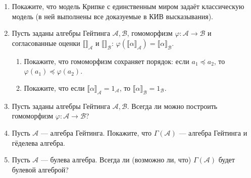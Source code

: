 \documentclass[10pt,a4paper,oneside]{article}
\begin{document}
\begin{enumerate}
\item Покажите, что модель Крипке с единственным миром задаёт классическую модель (в ней выполнены
все доказуемые в КИВ высказывания).

\item Пусть заданы алгебры Гейтинга $\mathcal{A},\mathcal{B}$, гомоморфизм $\varphi: \mathcal{A} \rightarrow \mathcal{B}$
и согласованные оценки $\llbracket\rrbracket_\mathcal{A}$ и $\llbracket\rrbracket_\mathcal{B}$: 
$\varphi(\llbracket\alpha\rrbracket_\mathcal{A}) = \llbracket\alpha\rrbracket_\mathcal{B}$.
\begin{enumerate}
\item Покажите, что гомоморфизм сохраняет порядок: если $a_1\preceq a_2$, то $\varphi(a_1) \preceq \varphi(a_2)$.
\item Покажите, что если $\llbracket \alpha \rrbracket_\mathcal{A} = 1_\mathcal{A}$, то $\llbracket\alpha\rrbracket_\mathcal{B} = 1_\mathcal{B}$.
\end{enumerate}

\item Пусть заданы алгебры Гейтинга $\mathcal{A},\mathcal{B}$. Всегда ли можно построить гомоморфизм $\varphi: \mathcal{A}\rightarrow\mathcal{B}$?

\item Пусть $\mathcal{A}$ --- алгебра Гейтинга. Покажите, что $\Gamma(\mathcal{A})$ --- алгебра Гейтинга и гёделева алгебра.

\item Пусть $\mathcal{A}$ --- булева алгебра. Всегда ли (возможно ли, что) $\Gamma(\mathcal{A})$ будет булевой алгеброй?
\end{enumerate}
\end{document}
